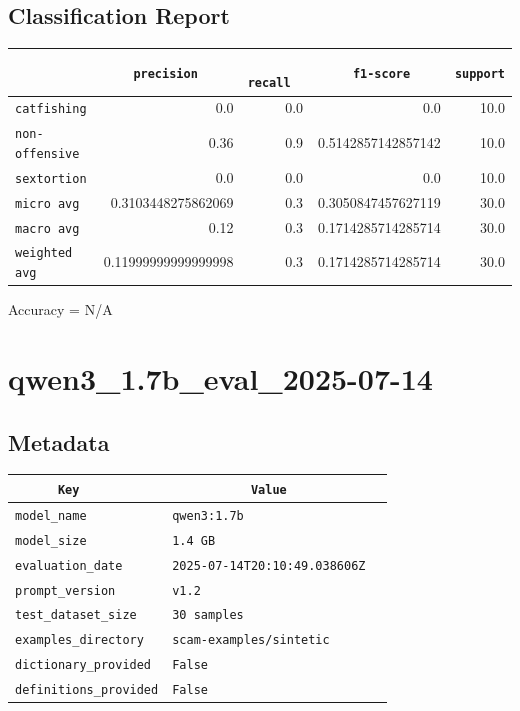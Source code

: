 \documentclass{article}
\begin{document}
\subsection{Classification Report}

\begin{center}
\begin{tabular}{l | r | r | r | r} \hline
    \verb|            | & \verb|    precision     | & \verb|      recall      | & \verb|     f1-score     | & \verb|support| \\ \hline
    \hline
    \verb|catfishing | & 0.0 & 0.0 & 0.0 &    10.0 \\ \hline
    \verb|non-offensive| & 0.36 & 0.9 & 0.5142857142857142 &    10.0 \\ \hline
    \verb|sextortion | & 0.0 & 0.0 & 0.0 &    10.0 \\ \hline
    \verb|micro avg  | & 0.3103448275862069 & 0.3 & 0.3050847457627119 &    30.0 \\ \hline
    \verb|macro avg  | & 0.12 & 0.3 & 0.1714285714285714 &    30.0 \\ \hline
    \verb|weighted avg| & 0.11999999999999998 & 0.3 & 0.1714285714285714 &    30.0 \\ \hline
\end{tabular}
\end{center}

\begin{center}
Accuracy = N/A
\end{center}

\section{qwen3\_1.7b\_eval\_2025-07-14}
\subsection{Metadata}

\begin{center}
\begin{tabular}{l | l} \hline
    \verb|      Key      | & \verb|           Value           | \\ \hline
    \hline
    \verb|model_name    | & \verb|qwen3:1.7b                   | \\ \hline
    \verb|model_size    | & \verb|1.4 GB                       | \\ \hline
    \verb|evaluation_date| & \verb|2025-07-14T20:10:49.038606Z  | \\ \hline
    \verb|prompt_version| & \verb|v1.2                         | \\ \hline
    \verb|test_dataset_size| & \verb|30 samples                   | \\ \hline
    \verb|examples_directory| & \verb|scam-examples/sintetic       | \\ \hline
    \verb|dictionary_provided| & \verb|False                        | \\ \hline
    \verb|definitions_provided| & \verb|False                        | \\ \hline
\end{tabular}
\end{center}
\end{document}
